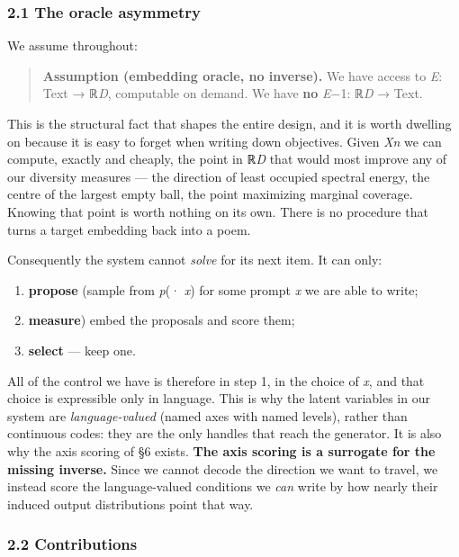 \documentclass[
  10pt,
]{article}
\providecommand{\tightlist}{%
  \setlength{\itemsep}{0pt}\setlength{\parskip}{0pt}}
\theoremstyle{plain}
\theoremstyle{definition}
\providecommand{\tightlist}{\setlength{\itemsep}{0pt}\setlength{\parskip}{0pt}}
\begin{document}
\subsubsection{2.1 The oracle asymmetry}\label{21-the-oracle-asymmetry}

We assume throughout:

\begin{quote}
\textbf{Assumption (embedding oracle, no inverse).} We have access to
\emph{E}: Text → ℝ\emph{D}, computable on demand. We have \textbf{no}
\emph{E}−1: ℝ\emph{D} → Text.
\end{quote}

This is the structural fact that shapes the entire design, and it is
worth dwelling on because it is easy to forget when writing down
objectives. Given \emph{Xn} we can compute, exactly and cheaply, the
point in ℝ\emph{D} that would most improve any of our diversity measures
--- the direction of least occupied spectral energy, the centre of the
largest empty ball, the point maximizing marginal coverage. Knowing that
point is worth nothing on its own. There is no procedure that turns a
target embedding back into a poem.

Consequently the system cannot \emph{solve} for its next item. It can
only:

\begin{enumerate}
\def\labelenumi{\arabic{enumi}.}
\tightlist
\item
  \textbf{propose} (sample from \emph{p}(· \textbar{} \emph{x}) for some
  prompt \emph{x} we are able to write;
\item
  \textbf{measure}) embed the proposals and score them;
\item
  \textbf{select} --- keep one.
\end{enumerate}

All of the control we have is therefore in step 1, in the choice of
\emph{x}, and that choice is expressible only in language. This is why
the latent variables in our system are \emph{language-valued} (named
axes with named levels), rather than continuous codes: they are the only
handles that reach the generator. It is also why the axis scoring of §6
exists. \textbf{The axis scoring is a surrogate for the missing
inverse.} Since we cannot decode the direction we want to travel, we
instead score the language-valued conditions we \emph{can} write by how
nearly their induced output distributions point that way.

\subsubsection{2.2 Contributions}\label{22-contributions}
\end{document}
